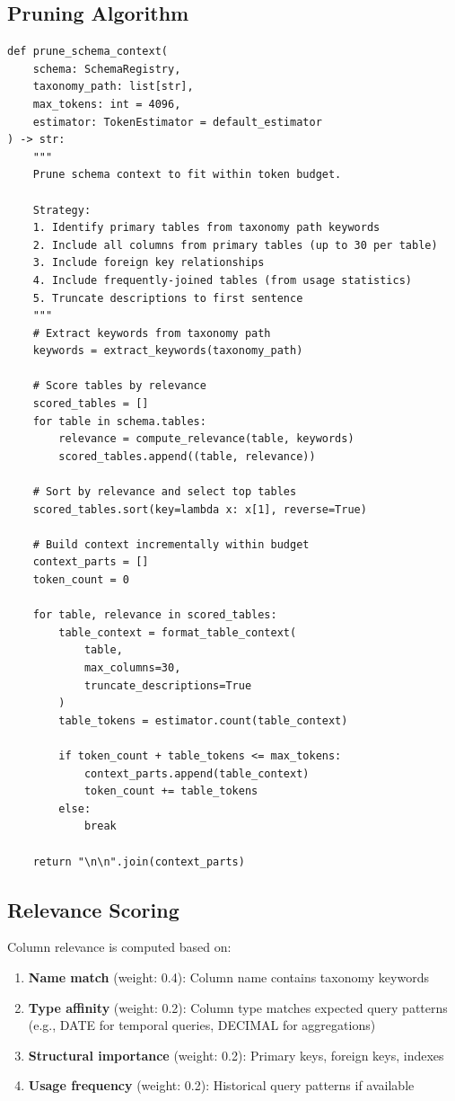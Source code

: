 \subsection{Pruning Algorithm}

\begin{lstlisting}[language=jsonx,caption={Schema context pruning algorithm}]
def prune_schema_context(
    schema: SchemaRegistry,
    taxonomy_path: list[str],
    max_tokens: int = 4096,
    estimator: TokenEstimator = default_estimator
) -> str:
    """
    Prune schema context to fit within token budget.
    
    Strategy:
    1. Identify primary tables from taxonomy path keywords
    2. Include all columns from primary tables (up to 30 per table)
    3. Include foreign key relationships
    4. Include frequently-joined tables (from usage statistics)
    5. Truncate descriptions to first sentence
    """
    # Extract keywords from taxonomy path
    keywords = extract_keywords(taxonomy_path)
    
    # Score tables by relevance
    scored_tables = []
    for table in schema.tables:
        relevance = compute_relevance(table, keywords)
        scored_tables.append((table, relevance))
    
    # Sort by relevance and select top tables
    scored_tables.sort(key=lambda x: x[1], reverse=True)
    
    # Build context incrementally within budget
    context_parts = []
    token_count = 0
    
    for table, relevance in scored_tables:
        table_context = format_table_context(
            table,
            max_columns=30,
            truncate_descriptions=True
        )
        table_tokens = estimator.count(table_context)
        
        if token_count + table_tokens <= max_tokens:
            context_parts.append(table_context)
            token_count += table_tokens
        else:
            break
    
    return "\n\n".join(context_parts)
\end{lstlisting}

\subsection{Relevance Scoring}

Column relevance is computed based on:
\begin{enumerate}
  \item \textbf{Name match} (weight: 0.4): Column name contains taxonomy keywords
  \item \textbf{Type affinity} (weight: 0.2): Column type matches expected query patterns
        (e.g., DATE for temporal queries, DECIMAL for aggregations)
  \item \textbf{Structural importance} (weight: 0.2): Primary keys, foreign keys, indexes
  \item \textbf{Usage frequency} (weight: 0.2): Historical query patterns if available
\end{enumerate}

